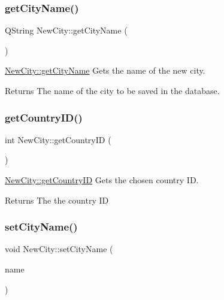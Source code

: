 \subsubsection{\texorpdfstring{get\+City\+Name()}{getCityName()}}
{\footnotesize\ttfamily Q\+String New\+City\+::get\+City\+Name (\begin{DoxyParamCaption}{ }\end{DoxyParamCaption})}



\mbox{\hyperlink{class_new_city_a3be62538974fa100134d694546608877}{New\+City\+::get\+City\+Name}} Gets the name of the new city. 

\begin{DoxyReturn}{Returns}
The name of the city to be saved in the database. 
\end{DoxyReturn}
\mbox{\label{class_new_city_a743baefdc6604f1bf8da124056939b0c}} 
\subsubsection{\texorpdfstring{get\+Country\+I\+D()}{getCountryID()}}
{\footnotesize\ttfamily int New\+City\+::get\+Country\+ID (\begin{DoxyParamCaption}{ }\end{DoxyParamCaption})}



\mbox{\hyperlink{class_new_city_a743baefdc6604f1bf8da124056939b0c}{New\+City\+::get\+Country\+ID}} Gets the chosen country ID. 

\begin{DoxyReturn}{Returns}
The the country ID 
\end{DoxyReturn}
\mbox{\label{class_new_city_afe093fcb1aa6623e896c52ea35ff0481}} 
\subsubsection{\texorpdfstring{set\+City\+Name()}{setCityName()}}
{\footnotesize\ttfamily void New\+City\+::set\+City\+Name (\begin{DoxyParamCaption}\item[{Q\+String}]{name }\end{DoxyParamCaption})}



